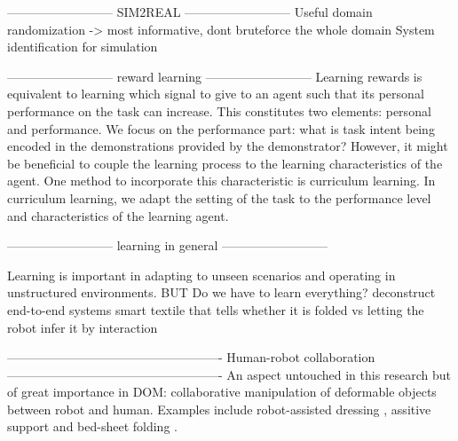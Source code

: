 \documentclass[\home/main.tex]{subfiles}
\begin{document}
--------------------------
    SIM2REAL
--------------------------
Useful domain randomization -> most informative, dont bruteforce the whole domain 
System identification for simulation 

--------------------------
    reward learning
--------------------------
Learning rewards is equivalent to learning which signal to give to an agent such that its personal performance on the task can increase. This constitutes two elements: personal and performance. We focus on the performance part: what is task intent being encoded in the demonstrations provided by the demonstrator? However, it might be beneficial to couple the learning process to the learning characteristics of the agent. One method to incorporate this characteristic is curriculum learning. In curriculum learning, we adapt the setting of the task to the performance level and characteristics of the learning agent.  

--------------------------
    learning in general
--------------------------

Learning is important in adapting to unseen scenarios and operating in unstructured environments. 
BUT
Do we have to learn everything?
    deconstruct end-to-end systems
    smart textile that tells whether it is folded vs letting the robot infer it by interaction 


 ----------------------------------------------------
    Human-robot collaboration
----------------------------------------------------
An aspect untouched in this research but of great importance in DOM: collaborative manipulation of deformable objects between robot and human. Examples include robot-assisted dressing \autocite{Gao2016}, assitive support \autocite{lu2017human} and bed-sheet folding \autocite{Kruse2015}.
\end{document}
